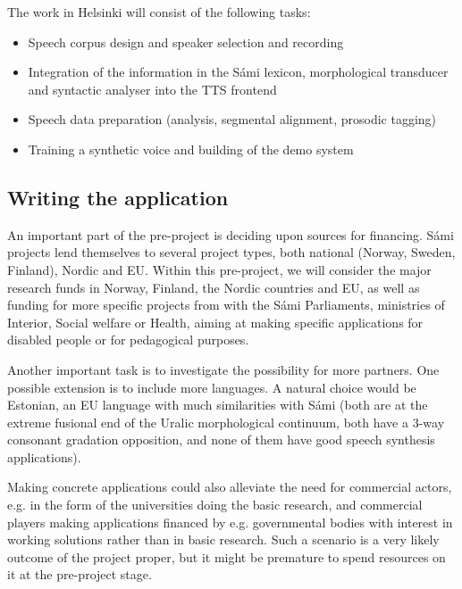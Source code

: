 \documentclass[a4paper,english]{article}
\begin{document}
The work in Helsinki will consist of the following tasks:

\begin{itemize}
\item Speech corpus design and speaker selection and recording 
\item Integration of the information in the Sámi lexicon, morphological transducer and syntactic analyser into the TTS frontend
\item Speech data preparation (analysis, segmental alignment, prosodic tagging)
\item Training a synthetic voice and building of the demo system 
\end{itemize}



\subsection{Writing the application}

An important part of the pre-project is deciding upon sources for financing. Sámi projects lend themselves to several project types, both national (Norway, Sweden, Finland), Nordic and EU. Within this pre-project, we will consider the major research funds in Norway, Finland, the Nordic countries and EU, as well as funding for more specific projects from with the Sámi Parliaments, ministries of Interior, Social welfare or Health, aiming at making specific applications for disabled people or for pedagogical purposes.

Another important task is to investigate the possibility for more partners. One possible extension is to include more languages. A natural choice would be Estonian, an EU language with much similarities with Sámi (both are at the extreme fusional end of the Uralic morphological continuum, both have a 3-way consonant gradation opposition, and none of them have good speech synthesis applications).

Making concrete applications could also alleviate the need for commercial actors, e.g. in the form of the universities doing the basic research, and commercial players making applications financed by e.g. governmental bodies with interest in working solutions rather than in basic research. Such a scenario is a very likely outcome of the project proper, but it might be premature to spend resources on it at the pre-project stage.
\end{document}
